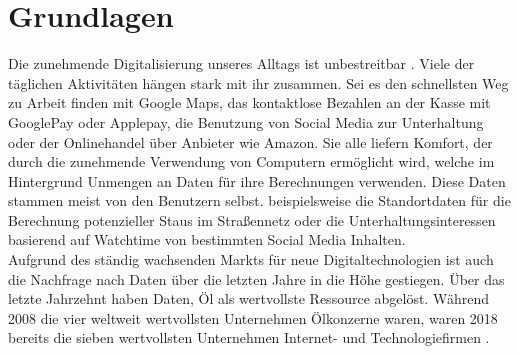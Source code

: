 \documentclass{scrreprt}
\begin{document}
\chapter{Grundlagen}
Die zunehmende Digitalisierung unseres Alltags ist unbestreitbar \cite{dt-digitalisierung-stat}. Viele der täglichen Aktivitäten hängen stark mit ihr zusammen. Sei es den schnellsten Weg zu Arbeit finden mit Google Maps, das kontaktlose Bezahlen an der Kasse mit GooglePay oder Applepay, die Benutzung von Social Media zur Unterhaltung oder der Onlinehandel über Anbieter wie Amazon. Sie alle liefern Komfort, der durch die zunehmende Verwendung von Computern ermöglicht wird, welche im Hintergrund Unmengen an Daten für ihre Berechnungen verwenden. Diese Daten stammen meist von den Benutzern selbst. beispielsweise die Standortdaten für die Berechnung potenzieller Staus im Straßennetz \cite{dt-googlemaps-staus} oder die Unterhaltungsinteressen basierend auf Watchtime von bestimmten Social Media Inhalten. \\
Aufgrund des ständig wachsenden Markts für neue Digitaltechnologien ist auch die Nachfrage nach Daten über die letzten Jahre in die Höhe gestiegen. Über das letzte Jahrzehnt haben Daten, Öl als wertvollste Ressource abgelöst. Während 2008 die vier weltweit wertvollsten Unternehmen Ölkonzerne waren, waren 2018 bereits die sieben wertvollsten Unternehmen Internet- und Technologiefirmen \cite{dt-falck2020rohstoff}. 
\end{document}
